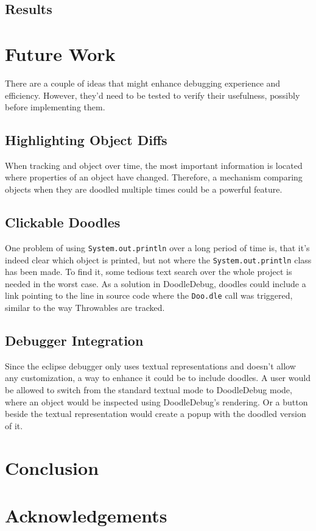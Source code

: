 \documentclass[english]{scrartcl}
\newcommand{\DD}{Dood\-le\-De\-bug\xspace}
\newcommand{\Doodle}{\texttt{Doo.\-dle}\xspace}
\newcommand{\println}{\texttt{Sys\-tem.\-out.\-println}\xspace}
\begin{document}
\subsection{Results}


\section{Future Work}
There are a couple of ideas that might enhance debugging experience and efficiency.
However, they'd need to be tested to verify their usefulness, possibly before implementing them.

\subsection{Highlighting Object Diffs}
When tracking and object over time, the most important information is located where properties of an object have changed.
Therefore, a mechanism comparing objects when they are doodled multiple times could be a powerful feature.

\subsection{Clickable Doodles}
One problem of using \println over a long period of time is, that it's indeed clear which object is printed, but not where the \println class has been made.
To find it, some tedious text search over the whole project is needed in the worst case.
As a solution in \DD, doodles could include a link pointing to the line in source code where the \Doodle call was triggered, similar to the way Throwables are tracked.

\subsection{Debugger Integration}
Since the eclipse debugger only uses textual representations and doesn't allow any customization, a way to enhance it could be to include doodles.
A user would be allowed to switch from the standard textual mode to \DD mode, where an object would be inspected using \DD's rendering.
Or a button beside the textual representation would create a popup with the doodled version of it.

\section{Conclusion}


\section{Acknowledgements}
\end{document}
